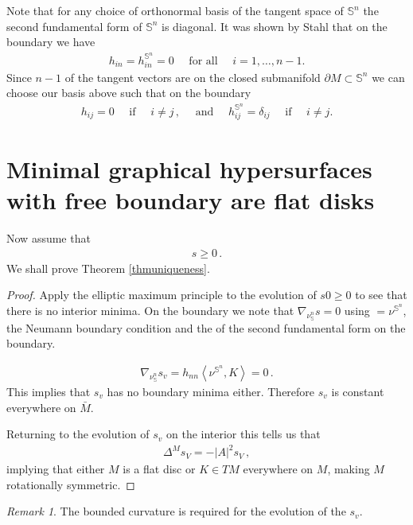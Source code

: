 \documentclass[10pt]{amsart}
\newcommand{\IP}[2]{\left< #1 , #2 \right>}
\renewcommand{\S}{\ensuremath{\mathbb{S}}}
\theoremstyle{remark}
\newtheorem*{rmk}{Remark}
\begin{document}
Note that for any choice of orthonormal basis of the tangent space of $\S^n$
the second fundamental form of $\S^n$ is diagonal.
It was shown by Stahl \cite{stahl1996convergence} that on the boundary we have
\begin{align*}
h_{in}=h^{\S^n}_{in}=0\quad \text{ for all }\quad i=1,\ldots,n-1.
\end{align*}
Since $n-1$ of the tangent vectors are on the closed submanifold $\partial M\subset\S^n$ we can choose
our basis above such that on the boundary
\begin{align*}
h_{ij}=0\quad  \text{ if } \quad i\neq j\,,\quad \text{ and }\quad h^{\S^n}_{ij}=\delta_{ij}\quad\text{ if }\quad i\neq j.
\end{align*}
\section{Minimal graphical hypersurfaces with free boundary are flat disks}
\label{KillingSection}

Now assume that
\begin{align}
	s \geq 0 \label{graphcondition}\,.
\end{align}
We shall prove Theorem \ref{thmuniqueness}.

\begin{proof}
Apply the elliptic maximum principle to the evolution of $s0\geq 0$ to see that
there is no interior minima. On the boundary we note that $\nabla_{\nu_\S^n}s=0$ using
$=\nu^{\S^n}$, the Neumann boundary condition and the  of the second fundamental form on the boundary. 

\begin{align*}
\nabla_{\nu_\S^n}s_v = h_{nn}\IP{\nu^{\S^n}}{K} = 0\,.
\end{align*}
This implies that $s_v$ has no boundary minima either.  Therefore $s_v$ is constant everywhere on $\bar M$.

Returning to the evolution of $s_v$ on the interior this tells us that
\begin{align*}
{\Delta}^M s_V = - |A|^2 s_V\,,
\end{align*}
implying that either $M$ is a flat disc or $K\in TM$ everywhere on $M$, making $M$ rotationally symmetric. 
\end{proof}

\begin{rmk}
The bounded curvature is required for the evolution of the $s_v$.
\end{rmk}

\end{document}
